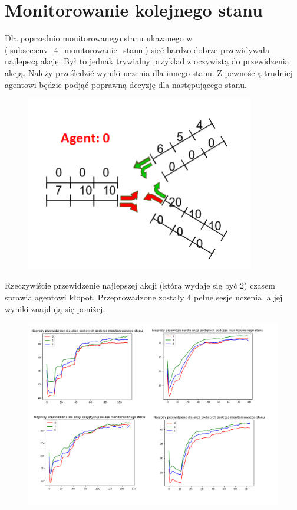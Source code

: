 \documentclass[12pt]{book}
\theoremstyle{plain}
\begin{document}
\section{Monitorowanie kolejnego stanu}	
	Dla poprzednio monitorowanego stanu ukazanego w (\ref{subsec:env_4_monitorowanie_stanu}) sieć bardzo dobrze przewidywała najlepszą akcję. Był to jednak trywialny przykład z oczywistą do przewidzenia akcją. Należy prześledzić wyniki uczenia dla innego stanu. Z pewnością trudniej agentowi będzie podjąć poprawną decyzję dla następującego stanu. 
	\begin{figure}[H]
		\centering
		\includegraphics[width=10cm]{env_4_monitorowany_stan_2.png}
		\label{fig:env_4_monitorowany_stan_2.png}
	\end{figure}
	
	Rzeczywiście przewidzenie najlepszej akcji (którą wydaje się być 2) czasem sprawia agentowi kłopot. Przeprowadzone zostały 4 pełne sesje uczenia, a jej wyniki znajdują się poniżej. 
	\begin{figure}[H]
		\includegraphics[width=20cm]{env_4_monitorowany_stan_2_ucz.png}
		\label{fig:env_4_monitorowany_stan_2_ucz.png}
	\end{figure}
	
\end{document}
